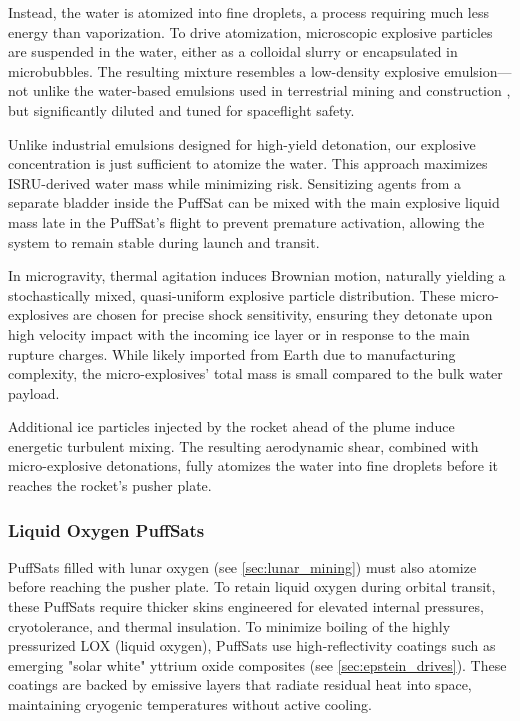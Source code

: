 \documentclass{article}
\begin{document}
Instead, the water is atomized into fine droplets, a process requiring much less energy than vaporization. To drive atomization, microscopic explosive particles are suspended in the water, either as a colloidal slurry or encapsulated in microbubbles.  The resulting mixture resembles a low-density explosive emulsion—not unlike the water-based emulsions used in terrestrial mining and construction \cite{emulsion_tutorial}, but significantly diluted and tuned for spaceflight safety.

Unlike industrial emulsions designed for high-yield detonation, our explosive concentration is just sufficient to atomize the water. This approach maximizes ISRU-derived water mass while minimizing risk. Sensitizing agents from a separate bladder inside the PuffSat can be mixed  with the main explosive liquid mass late in the PuffSat’s flight to prevent premature activation, allowing the system to remain stable during launch and transit.  

In microgravity, thermal agitation induces Brownian motion, naturally yielding a stochastically mixed, quasi-uniform explosive particle distribution. These micro-explosives are chosen for precise shock sensitivity, ensuring they detonate upon high velocity impact with the incoming ice layer or in response to the main rupture charges. While likely imported from Earth due to manufacturing complexity, the micro-explosives' total mass is small compared to the bulk water payload.

Additional ice particles injected by the rocket ahead of the plume induce energetic turbulent mixing. The resulting aerodynamic shear, combined with micro-explosive detonations, fully atomizes the water into fine droplets before it reaches the rocket’s pusher plate.

\subsubsection{Liquid Oxygen PuffSats}\label{sec:lox_puffsat}
PuffSats filled with lunar oxygen (see \autoref{sec:lunar_mining}) must also atomize before reaching the pusher plate. To retain liquid oxygen during orbital transit, these PuffSats require thicker skins engineered for elevated internal pressures, cryotolerance, and thermal insulation. To minimize boiling of the highly pressurized LOX (liquid oxygen), PuffSats use high-reflectivity coatings such as emerging "solar white" yttrium oxide composites (see \autoref{sec:epstein_drives}).  These coatings are backed by emissive layers that radiate residual heat into space, maintaining cryogenic temperatures without active cooling.
\end{document}

